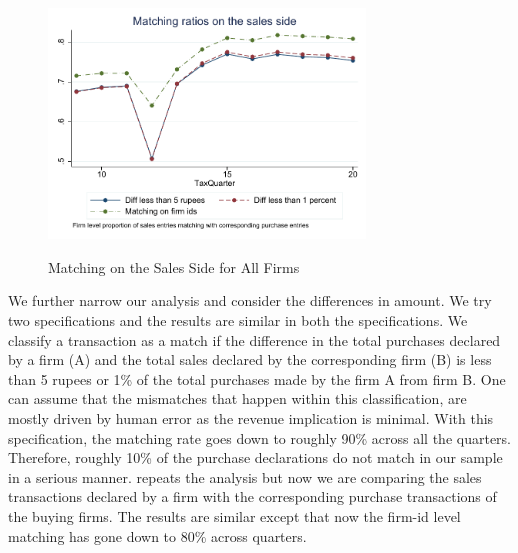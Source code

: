 \begin{figure}[H] 
\centering
\caption{Matching on the Sales Side for All Firms}
\includegraphics[width=0.75\textwidth]{graphs/AvgMatch_Sales_alltypes.pdf}
\label{fig:matching_sales}
\end{figure}


We further narrow our analysis and consider the differences in amount. We try two specifications and the results are similar in both the specifications. We classify a transaction as a match if the difference in the total purchases declared by a firm (A) and the total sales declared by the corresponding firm (B) is less than 5 rupees or 1\% of the total purchases made by the firm A from firm B. One can assume that the mismatches that happen within this classification, are mostly driven by human error as the revenue implication is minimal. With this specification, the matching rate goes down to roughly 90\% across all the quarters. Therefore, roughly 10\% of the purchase declarations do not match in our sample in a serious manner.  repeats the analysis but now we are comparing the sales transactions declared by  a firm with the corresponding purchase transactions of the buying firms. The results are similar except that now the firm-id level matching has gone down to 80\% across quarters. 



